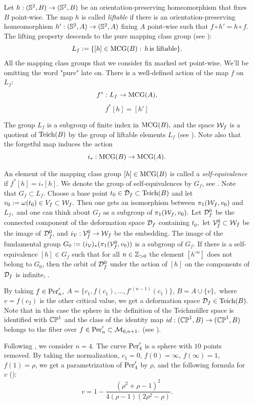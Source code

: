 \documentclass{article}
\begin{document}
Let $h:(\S^2, B)\to (\S^2,B)$ be an orientation-preserving homeomorphism that fixes $B$ point-wise. The map $h$ is called \textit{liftable} if there is an orientation-preserving homeomorphism  $h':(\S^2, A)\to (\S^2,A)$ fixing $A$ point-wise such that $f\circ  h'=h\circ f.$ The lifting property descends to the pure mapping class group (see \cite{KPS}):
$$
L_f:=\{[h]\in \Mapp(B):\, h\, \mbox{is liftable}\}.
$$
All the mapping class groups that we consider fix marked set point-wise. We'll be omitting the word "pure" late on.
There is a well-defined action of the map $f$ on $L_f:$ 
$$f^*:L_f\to \Mapp(A),$$
$$f^*[h]=[h']$$

The group $L_f$ is a subgroup of finite index in $\Mapp(B),$ and the space $\W_f$ is a quotient of $\Teich(B)$ by the group of liftable elements $L_f$ (see \cite{K}). Note also that the forgetful map induces the action 
$$
i_*:\Mapp(B)\to \Mapp(A).
$$

An element of the mapping class group $[h]\in \Mapp(B)$ is called a \textit{self-equivalence} if $f^*[h]=i_*[h].$ We denote the group of self-equivalences by $G_f$, see \cite{FKS}. Note that $G_f\subset L_f.$ Choose a base point $t_0\in\D_f\subset\Teich(B)$ and let $v_0:=\omega(t_0)\in V_f\subset\W_f.$ Then one gets an isomorphism between $\pi_1(\W_f,v_0)$ and $L_f,$ and one can think about $G_f$ as a subgroup of $\pi_1(\W_f,v_0).$ Let $\D_f^0$ be the connected component of the deformation space $\D_f$ containing $t_0,$ let $\V_f^0\subset\W_f$ be the image of $\D_f^0,$ and $i_\V:\V_f^0\to\W_f$ be the embedding. The image of the fundamental group $G_0:=(i_\V)_*(\pi_1(\V_f^0,v_0))$ is a subgroup of $G_f$. If there is a self-equivalence $[h]\in G_f$ such that for all $n\in\Z_{>0}$ the element $[h^{\circ n}]$ does not belong to $G_0$, then the orbit of $\D_f^0$ under the action of $[h]$ on the components of $\D_f$ is infinite, \cite{HK}.

By taking $f\in \Per'_n,$ $A=\{c_1, f(c_1),\dots, f^{\circ(n-1)}(c_1)\}$, $B=A\cup\{v\},$ where $v=f(c_2)$ is the other critical value, we get a deformation space $\D_f\in \Teich(B).$ Note that in this case the sphere in the definition of the Teichm\"uller space is identified with $\CP$ and the class of the identity map $id:(\CP,B)\to (\CP,B)$ belongs to the fiber over $f\in\Per'_n\subset \M_{0,n+1}.$ %
(see \cite{FKS}).
 
Following \cite{FKS}, we consider $n=4.$ The curve $\Per'_4$ is a sphere with $10$ points removed. By taking the normalization, $c_1=0$, $f(0)=\infty$, $f(\infty)=1,$ $f(1)=\rho$, we get a parametrization of $\Per'_4$ by $\rho$, and the following formula for $v$ (\cite{FKS}):
$$
v=1-\frac{(\rho^2+\rho-1)^2}{4(\rho-1)(2\rho^2-\rho)}.
$$
\end{document}
